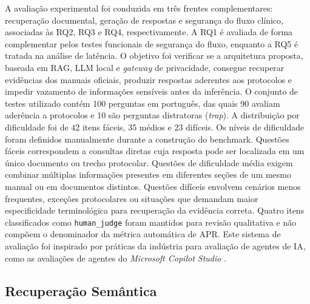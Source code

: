 A avaliação experimental foi conduzida em três frentes complementares: recuperação documental, geração de respostas e segurança do fluxo clínico, associadas às RQ2, RQ3 e RQ4, respectivamente. A RQ1 é avaliada de forma complementar pelos testes funcionais de segurança do fluxo, enquanto a RQ5 é tratada na análise de latência. 
O objetivo foi verificar se a arquitetura proposta, baseada em RAG, LLM local e \textit{gateway} de privacidade, consegue recuperar evidências dos manuais oficiais, produzir respostas aderentes aos protocolos e impedir vazamento de informações sensíveis antes da inferência.
O conjunto de testes utilizado contém 100 perguntas em português, das quais 90 avaliam aderência a protocolos e 10 são perguntas distratoras (\textit{trap}).
A distribuição por dificuldade foi de 42 itens fáceis, 35 médios e 23 difíceis.
Os níveis de dificuldade foram definidos manualmente durante a construção do benchmark.
Questões fáceis correspondem a consultas diretas cuja resposta pode ser localizada em um único documento ou trecho protocolar.
Questões de dificuldade média exigem combinar múltiplas informações presentes em diferentes seções de um mesmo manual ou em documentos distintos.
Questões difíceis envolvem cenários menos frequentes, exceções protocolares ou situações que demandam maior especificidade terminológica para recuperação da evidência correta.
Quatro itens classificados como \texttt{human\_judge} foram mantidos para revisão qualitativa e não compõem o denominador da métrica automática de APR.
Este sistema de avaliação foi inspirado por práticas da indústria para avaliação de agentes de IA, como as avaliações de agentes do \textit{Microsoft Copilot Studio} \cite{MicrosoftCopilotEval2026}.


\subsection{Recuperação Semântica}

